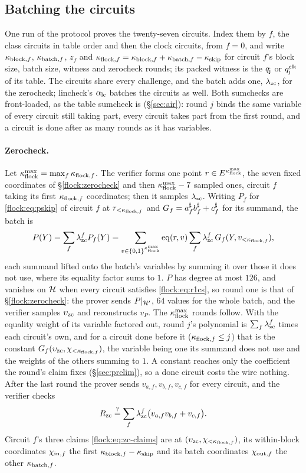 \subsection{Batching the circuits}\label{flock:batch}

One run of the protocol proves the twenty-seven circuits. Index them by $f$, the class circuits in table order and then the clock circuits, from $f=0$, and write $\kappa_{\mathrm{block},f}$, $\kappa_{\mathrm{batch},f}$, $z_f$ and $\kappa_{\mathrm{flock},f}=\kappa_{\mathrm{block},f}+\kappa_{\mathrm{batch},f}-\kappa_{\mathrm{skip}}$ for circuit $f$'s block size, batch size, witness and zerocheck rounds; its packed witness is the $q_{\mathsf{j}}$ or $q^{\mathsf{clk}}_{\mathsf{j}}$ of its table. The circuits share every challenge, and the batch adds one, $\lambda_{\mathrm{zc}}$, for the zerocheck; lincheck's $\alpha_{\mathrm{lc}}$ batches the circuits as well. Both sumchecks are front-loaded, as the table sumcheck is (\S\ref{sec:air}): round $j$ binds the same variable of every circuit still taking part, every circuit takes part from the first round, and a circuit is done after as many rounds as it has variables.

\paragraph{Zerocheck.} Let $\kappa_{\mathrm{flock}}^{\max}=\max_f\kappa_{\mathrm{flock},f}$. The verifier forms one point $r\in E^{\kappa_{\mathrm{flock}}^{\max}}$, the seven fixed coordinates of \S\ref{flock:zerocheck} and then $\kappa_{\mathrm{flock}}^{\max}-7$ sampled ones, circuit $f$ taking its first $\kappa_{\mathrm{flock},f}$ coordinates; then it samples $\lambda_{\mathrm{zc}}$. Writing $P_f$ for \eqref{flock:eq:pskip} of circuit $f$ at $r_{<\kappa_{\mathrm{flock},f}}$ and $G_f=a^{\sharp}_fb^{\sharp}_f+c^{\sharp}_f$ for its summand, the batch is
\[
P(Y)=\sum_f\lambda_{\mathrm{zc}}^{f}P_f(Y)=\sum_{v\in\{0,1\}^{\kappa_{\mathrm{flock}}^{\max}}}\operatorname{eq}(r,v)\sum_f\lambda_{\mathrm{zc}}^{f}\,G_f(Y,v_{<\kappa_{\mathrm{flock},f}}),
\]
each summand lifted onto the batch's variables by summing it over those it does not use, where its equality factor sums to $1$. $P$ has degree at most $126$, and vanishes on $\mathcal{H}$ when every circuit satisfies \eqref{flock:eq:r1cs}, so round one is that of \S\ref{flock:zerocheck}: the prover sends $P|_{\mathcal{H}'}$, $64$ values for the whole batch, and the verifier samples $\upsilon_{\mathrm{zc}}$ and reconstructs $v_P$. The $\kappa_{\mathrm{flock}}^{\max}$ rounds follow. With the equality weight of its variable factored out, round $j$'s polynomial is $\sum_f\lambda_{\mathrm{zc}}^f$ times each circuit's own, and for a circuit done before it ($\kappa_{\mathrm{flock},f}\le j$) that is the constant $G_f(\upsilon_{\mathrm{zc}},\chi_{<\kappa_{\mathrm{flock},f}})$, the variable being one its summand does not use and the weights of the others summing to $1$. A constant reaches only the coefficient the round's claim fixes (\S\ref{sec:prelim}), so a done circuit costs the wire nothing. After the last round the prover sends $v_{a,f},v_{b,f},v_{c,f}$ for every circuit, and the verifier checks
\begin{equation}\label{flock:eq:batch-zc-terminal}
R_{\mathrm{zc}}\stackrel{?}{=}\sum_f\lambda_{\mathrm{zc}}^{f}\bigl(v_{a,f}v_{b,f}+v_{c,f}\bigr).
\end{equation}
Circuit $f$'s three claims \eqref{flock:eq:zc-claims} are at $(\upsilon_{\mathrm{zc}},\chi_{<\kappa_{\mathrm{flock},f}})$, its within-block coordinates $\chi_{\mathrm{in},f}$ the first $\kappa_{\mathrm{block},f}-\kappa_{\mathrm{skip}}$ and its batch coordinates $\chi_{\mathrm{out},f}$ the other $\kappa_{\mathrm{batch},f}$.

